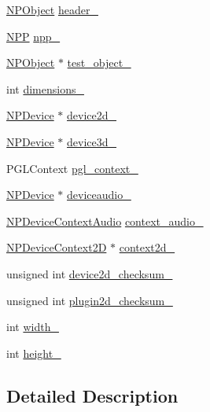 \begin{DoxyCompactItemize}
\item 
\hyperlink{struct_n_p_object}{NPObject} \hyperlink{class_plugin_object_a2d49cd1ca32c2522400d2505bd3e357e}{header\_\-}
\item 
\hyperlink{struct___n_p_p}{NPP} \hyperlink{class_plugin_object_a73abf33dbc703aaab8c133b4fc16a6f4}{npp\_\-}
\item 
\hyperlink{struct_n_p_object}{NPObject} $\ast$ \hyperlink{class_plugin_object_aa643ef173ea31331094fbf809d87b70d}{test\_\-object\_\-}
\item 
int \hyperlink{class_plugin_object_a60f6c920af50735f647d1715d7a27384}{dimensions\_\-}
\item 
\hyperlink{struct_n_p_device}{NPDevice} $\ast$ \hyperlink{class_plugin_object_a32c9649b557037cc8fbbf95f8c126c15}{device2d\_\-}
\item 
\hyperlink{struct_n_p_device}{NPDevice} $\ast$ \hyperlink{class_plugin_object_af2fd117655e58027408e3cde1f7283fb}{device3d\_\-}
\item 
PGLContext \hyperlink{class_plugin_object_a3819f8c68ea54fa3717c1487e288ee88}{pgl\_\-context\_\-}
\item 
\hyperlink{struct_n_p_device}{NPDevice} $\ast$ \hyperlink{class_plugin_object_aec43fcb4f77ce50598bb1851b100d045}{deviceaudio\_\-}
\item 
\hyperlink{struct___n_p_device_context_audio}{NPDeviceContextAudio} \hyperlink{class_plugin_object_a29a7c72b105825ff135a29c9af9206f2}{context\_\-audio\_\-}
\item 
\hyperlink{struct___n_p_device_context2_d}{NPDeviceContext2D} $\ast$ \hyperlink{class_plugin_object_ac4e47e096e7046c00152e0979a120059}{context2d\_\-}
\item 
unsigned int \hyperlink{class_plugin_object_ac792c1966624836cbbadf26eaeae4e52}{device2d\_\-checksum\_\-}
\item 
unsigned int \hyperlink{class_plugin_object_a1efe762777df7a3fc4b879d723598ef7}{plugin2d\_\-checksum\_\-}
\item 
int \hyperlink{class_plugin_object_a2aa3a91e29c0c89a9c887aaba1f1b9d0}{width\_\-}
\item 
int \hyperlink{class_plugin_object_af5872be14fbb29cf6cdf6df495766dd1}{height\_\-}
\end{DoxyCompactItemize}


\subsection{Detailed Description}


